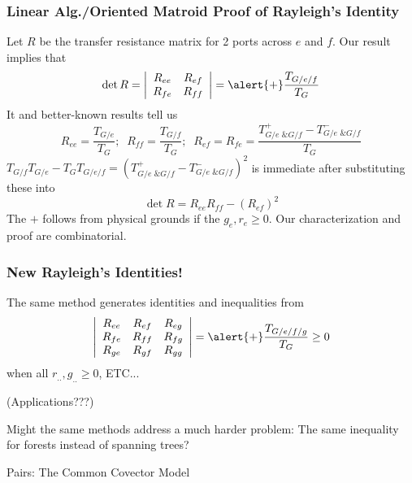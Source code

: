 \documentclass{beamer}
\newcommand{\Remph}[1]{{\color{red}#1}}
\begin{document}
\begin{frame}
\frametitle{Linear Alg./Oriented Matroid Proof of Rayleigh's Identity}
Let $R$ be the transfer resistance matrix for 2 ports across $e$ and $f$.
Our result implies that
\[
\det R = \left|\begin{array}{cc} R_{ee} & R_{ef} \\ R_{fe} & R_{ff} \end{array}\right|
= \alert{+} \frac{T_{G/e/f}}{T_G}
\]
It and better-known results tell us
\[
R_{ee} = \frac{T_{G/e}}{T_G};\;\;R_{ff} = \frac{T_{G/f}}{T_G};\;\;
R_{ef}=R_{fe}=\frac{ T^+_{G/e \text{ \& } G/f} - T^-_{G/e \text{ \& } G/f} }{T_G}
\]
$T_{G/f}T_{G/e} - T_GT_{G/e/f} = \left( T^+_{G/e \text{ \& } G/f} - T^-_{G/e \text{ \& } G/f} \right)^2$
is immediate after substituting these into
\[
\det R = R_{ee}R_{ff}-(R_{ef})^2
\]
\alert{The $+$ follows from physical grounds if the $g_e, r_e \geq 0$.  Our
characterization and proof are combinatorial.}
\end{frame}

\begin{frame}
\frametitle{New Rayleigh's Identities!}

The same method generates identities and inequalities from
\[
\left|
\begin{array}{ccc} R_{ee} & R_{ef} & R_{eg} \\ 
                   R_{fe} & R_{ff} & R_{fg} \\
                   R_{ge} & R_{gf} & R_{gg}
\end{array}\right|
= \alert{+} \frac{T_{G/e/f/g}}{T_G} \ge 0
\]
when all $r_{..}, g_{..} \ge 0$, ETC...

\vfill

(Applications???)

\vfill

\Remph{Might the same methods address a much harder problem:
The same inequality for } forests \Remph{ instead of 
spanning trees?}

\vfill
\end{frame}



\begin{frame}{Pairs: The Common Covector Model}

\end{frame}
\end{document}
